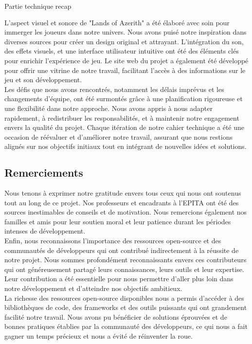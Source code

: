 Partie technique recap

L'aspect visuel et sonore de "Lands of Azerith" a été élaboré avec soin pour immerger les joueurs dans notre univers.
Nous avons puisé notre inspiration dans diverses sources pour créer un design original et attrayant.
L'intégration du son, des effets visuels, et une interface utilisateur intuitive ont été des éléments clés pour enrichir l'expérience de jeu.
Le site web du projet a également été développé pour offrir une vitrine de notre travail, facilitant l'accès à des informations sur le jeu et son développement.
\\

Les défis que nous avons rencontrés, notamment les délais imprévus et les changements d'équipe, ont été surmontés grâce à une planification rigoureuse
et une flexibilité dans notre approche. Nous avons appris à nous adapter rapidement, à redistribuer les responsabilités, et à maintenir notre engagement
envers la qualité du projet. Chaque itération de notre cahier technique a été une occasion de réévaluer et d'améliorer notre travail, assurant que nous
restions alignés sur nos objectifs initiaux tout en intégrant de nouvelles idées et solutions.
\\

\subsection{Remerciements}

Nous tenons à exprimer notre gratitude envers tous ceux qui nous ont soutenus tout au long de ce projet.
Nos professeurs et encadrants à l'EPITA ont été des sources inestimables de conseils et de motivation.
Nous remercions également nos familles et amis pour leur soutien moral et leur patience durant les périodes intenses de développement.
\\

Enfin, nous reconnaissons l'importance des ressources open-source et des communautés de développeurs qui ont contribué indirectement à la réussite de notre projet.
Nous sommes profondément reconnaissants envers ces contributeurs qui ont généreusement partagé leurs connaissances, leurs outils et leur expertise.
Leur contribution a été essentielle pour nous permettre d'aller plus loin dans notre développement et d'atteindre nos objectifs ambitieux.
\\

La richesse des ressources open-source disponibles nous a permis d'accéder à des bibliothèques de code, des frameworks et des outils puissants qui ont grandement facilité notre travail.
Nous avons pu bénéficier de solutions éprouvées et de bonnes pratiques établies par la communauté des développeurs, ce qui nous a fait gagner un temps précieux et nous a évité de réinventer la roue.
\\

